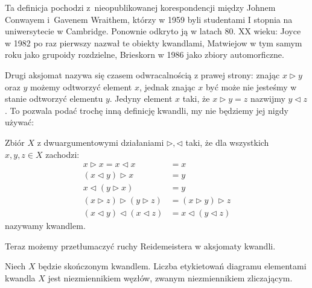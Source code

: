 Ta definicja pochodzi z~nieopublikowanej korespondencji między Johnem Conwayem i~Gavenem Wraithem, którzy w 1959 byli studentami I stopnia na uniwersytecie w Cambridge.
%
%
Ponownie odkryto ją w latach 80. XX wieku: Joyce w 1982 po raz pierwszy nazwał te obiekty kwandlami, Matwiejow w tym samym roku jako grupoidy rozdzielne, Brieskorn w 1986 jako zbiory automorficzne.
%
%
%
%
%

Drugi aksjomat nazywa się czasem odwracalnością z prawej strony: znając $x \triangleright y$ oraz $y$ możemy odtworzyć element $x$, jednak znając $x$ być może nie jesteśmy w stanie odtworzyć elementu $y$.
Jedyny element $x$ taki, że $x \triangleright y = z$ nazwijmy $y \triangleleft z$.
To pozwala podać trochę inną definicję kwandli, my nie będziemy jej nigdy używać:

\begin{definition}
    Zbiór $X$ z dwuargumentowymi działaniami $\triangleright, \triangleleft$ taki, że dla wszystkich $x, y, z \in X$ zachodzi:
    \begin{align*}
    x \triangleright x = x \triangleleft x & = x \\
    (x \triangleleft y) \triangleright x & = y \\
    x \triangleleft (y \triangleright x) & = y \\
     (x \triangleright z) \triangleright (y \triangleright z) & = (x \triangleright y) \triangleright z \\
    (x \triangleleft y) \triangleleft (x \triangleleft z) & = x \triangleleft (y \triangleleft z)
    \end{align*}
    nazywamy kwandlem.
\end{definition}

Teraz możemy przetłumaczyć ruchy Reidemeistera w aksjomaty kwandli.
%

\begin{proposition}
%
    Niech $X$ będzie skończonym kwandlem.
    Liczba etykietowań diagramu elementami kwandla $X$ jest niezmiennikiem węzłów, zwanym niezmiennikiem zliczającym.
\end{proposition}

